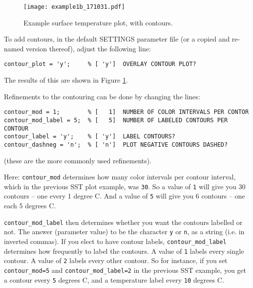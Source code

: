 \documentclass[11pt,fleqn]{book} %
\begin{document}
\begin{enumerate}[noitemsep]
\begin{figure}[ht]
\begin{center}
\texttt{[image: example1b\_171031.pdf]}
\end{center}
\vspace{-4mm}
\caption{Example surface temperature plot, with contours.}
\label{fig:example1b}
\end{figure}

\vspace{4pt}
To add contours, in the default \footnotesize\textsf{SETTINGS }\normalsize parameter file (or a copied and re-named version thereof), adjust the following line:
\small
\vspace{-2pt}\begin{verbatim}
contour_plot = 'y';     % [ 'y']  OVERLAY CONTOUR PLOT?
\end{verbatim}\vspace{-2pt}
\normalsize
The results of this are shown in Figure \ref{fig:example1b}.

\pagebreak

Refinements to the contouring can be done by changing the lines:
\small
\vspace{-2pt}\begin{verbatim}
contour_mod = 1;        % [   1]  NUMBER OF COLOR INTERVALS PER CONTOR
contour_mod_label = 5;  % [   5]  NUMBER OF LABELED CONTOURS PER CONTOUR
contour_label = 'y';    % [ 'y']  LABEL CONTOURS?
contour_dashneg = 'n';  % [ 'n']  PLOT NEGATIVE CONTOURS DASHED?
\end{verbatim}\vspace{-2pt}
\normalsize
(these are the more commonly used refinements).

Here: \texttt{contour\_mod} determines how many color intervals per contour interval, which in the previous SST plot example, was \texttt{30}. So a value of \texttt{1} will give you 30 contours -- one every 1 degree C. And a value of \texttt{5} will give you 6 contours -- one each 5 degrees C.

\texttt{contour\_mod\_label} then determines whether you want the contours labelled or not. The answer (parameter value) to be the character \texttt{y} or \texttt{n}, as a string (i.e. in inverted commas). If you elect to have contour labels, \texttt{contour\_mod\_label} determines how frequently to label the contours. A value of \texttt{1} labels every single contour. A value of \texttt{2} labels every other contour. So for instance, if you set \texttt{contour\_mod=5} and \texttt{contour\_mod\_label=2} in the previous SST example, you get a contour every \texttt{5} degrees C, and a temperature label every \texttt{10} degrees C.


\end{enumerate}
\end{document}
